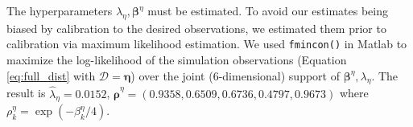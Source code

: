 \documentclass{article}
\begin{document}
The hyperparameters $\lambda_\eta,\boldsymbol \beta^\eta$ must be estimated.
% 
To avoid our estimates being biased by calibration to the desired observations, we estimated them prior to calibration via maximum likelihood estimation.
% 
%
We used \texttt{fmincon()} in {\sc Matlab} %
to maximize the log-likelihood of the simulation observations  (Equation \eqref{eq:full_dist} with $\mathcal D=\boldsymbol\eta$) over the joint (6-dimensional) support of $\boldsymbol \beta^\eta,\lambda_\eta$.  
%
The result is $\hat\lambda_\eta = 0.0152$, $\boldsymbol {\hat\rho}^\eta = (0.9358, 0.6509, 0.6736, 0.4797, 0.9673)$
where $\rho^\eta_k = \exp(-\beta_k^\eta/4)$. 

%
%
%

%
%
\end{document}
